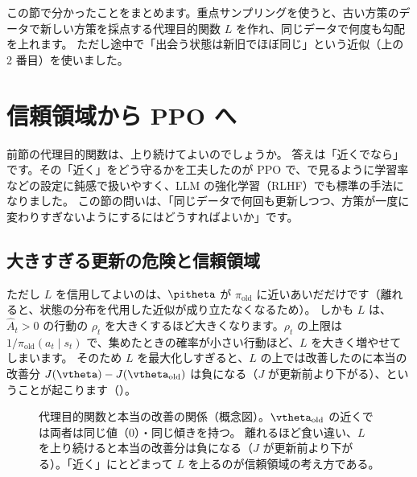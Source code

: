 この節で分かったことをまとめます。重点サンプリングを使うと、古い方策のデータで新しい方策を採点する代理目的関数 $L$ を作れ、同じデータで何度も勾配を上れます。
ただし途中で「出会う状態は新旧でほぼ同じ」という近似（上の 2 番目）を使いました。

\section{信頼領域から PPO へ}\label{sec:pg-ppo}

前節の代理目的関数は、上り続けてよいのでしょうか。
答えは「近くでなら」です。その「近く」をどう守るかを工夫したのが PPO で、で見るように学習率などの設定に鈍感で扱いやすく、LLM の強化学習（RLHF）でも標準の手法になりました\cite{ouyang2022training}。
この節の問いは、「同じデータで何回も更新しつつ、方策が一度に変わりすぎないようにするにはどうすればよいか」です。

\subsection*{大きすぎる更新の危険と信頼領域}

ただし $L$ を信用してよいのは、$\pitheta$ が $\pi_{\text{old}}$ に近いあいだだけです（離れると、状態の分布を代用した近似が成り立たなくなるため）。
しかも $L$ は、$\hat{A}_t>0$ の行動の $\rho_t$ を大きくするほど大きくなります。$\rho_t$ の上限は $1/\pi_{\text{old}}(a_t\mid s_t)$ で、集めたときの確率が小さい行動ほど、$L$ を大きく増やせてしまいます。
そのため $L$ を最大化しすぎると、$L$ の上では改善したのに本当の改善分 $J(\vtheta)-J(\vtheta_{\text{old}})$ は負になる（$J$ が更新前より下がる）、ということが起こります（）。

\begin{figure}[tbp]
\centering
{}
\caption{代理目的関数と本当の改善の関係（概念図）。$\vtheta_{\text{old}}$ の近くでは両者は同じ値（0）・同じ傾きを持つ。
離れるほど食い違い、$L$ を上り続けると本当の改善分は負になる（$J$ が更新前より下がる）。「近く」にとどまって $L$ を上るのが信頼領域の考え方である。}
\label{fig:pg-trust-region}
\end{figure}

